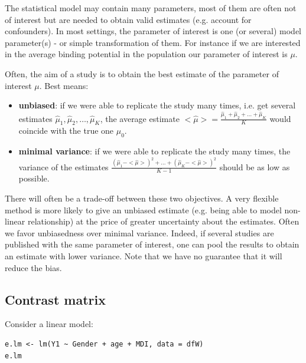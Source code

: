\documentclass[12pt]{article}
\begin{document}
The statistical model may contain many parameters, most of them are
often not of interest but are needed to obtain valid estimates
(e.g. account for confounders). In most settings, the parameter of
interest is one (or several) model parameter(s) - or simple
transformation of them. For instance if we are interested in the
average binding potential in the population our parameter of interest
is \(\mu\).

\bigskip

Often, the aim of a study is to obtain the best estimate of the
parameter of interest \(\mu\). Best means:
\begin{itemize}
\item \textbf{unbiased}: if we were able to replicate the study many times,
i.e. get several estimates \(\hat{\mu}_1,\hat{\mu}_2,\ldots,\hat{\mu}_K\), the
average estimate \(<\hat{\mu}>=\frac{\hat{\mu}_1+\hat{\mu}_2+\ldots+\hat{\mu}_K}{K}\) would coincide with the true one \(\mu_0\).
\item \textbf{minimal variance}: if we were able to replicate the study many
times, the variance of the estimates
\(\frac{(\hat{\mu}_1-<\hat{\mu}>)^2+\ldots+(\hat{\mu}_K-<\hat{\mu}>)^2}{K-1}\)
should be as low as possible.
\end{itemize}

There will often be a trade-off between these two objectives. A very
flexible method is more likely to give an unbiased estimate
(e.g. being able to model non-linear relationship) at the price of
greater uncertainty about the estimates. Often we favor unbiasedness
over minimal variance. Indeed, if several studies are published with
the same parameter of interest, one can pool the results to obtain an
estimate with lower variance. Note that we have no guarantee that it
will reduce the bias.

\subsection{Contrast matrix}
\label{sec:org652af09}

Consider a linear model:
\lstset{language=r,label= ,caption= ,captionpos=b,numbers=none}
\begin{lstlisting}
e.lm <- lm(Y1 ~ Gender + age + MDI, data = dfW)
e.lm
\end{lstlisting}
\end{document}
